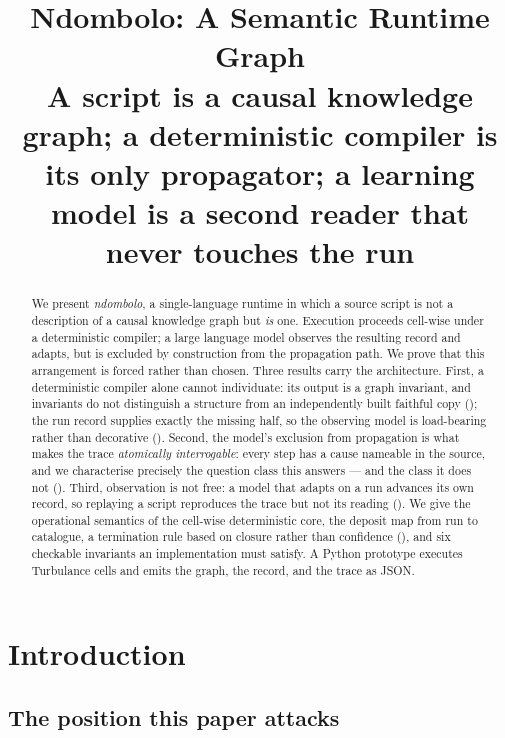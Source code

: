 \documentclass[twocolumn,11pt,a4paper]{article}
\title{\bfseries Ndombolo: A Semantic Runtime Graph\\[0.35em]
\large A script is a causal knowledge graph; a deterministic compiler is its
only propagator; a learning model is a second reader that never touches the run}
\author{}
\date{}
\theoremstyle{sup}
\theoremstyle{definition}
\theoremstyle{remark}
\begin{document}
\maketitle

\begin{abstract}
We present \emph{ndombolo}, a single-language runtime in which a source script
is not a description of a causal knowledge graph but \emph{is} one. Execution
proceeds cell-wise under a deterministic compiler; a large language model
observes the resulting record and adapts, but is excluded by construction from
the propagation path. We prove that this arrangement is forced rather than
chosen. Three results carry the architecture. First, a deterministic compiler
alone cannot individuate: its output is a graph invariant, and invariants do
not distinguish a structure from an independently built faithful copy
(); the run record supplies exactly the missing half,
so the observing model is load-bearing rather than decorative
(). Second, the model's exclusion from propagation
is what makes the trace \emph{atomically interrogable}: every step has a cause
nameable in the source, and we characterise precisely the question class this
answers --- and the class it does not ().
Third, observation is not free: a model that adapts on a run advances its own
record, so replaying a script reproduces the trace but not its reading
(). We give the operational semantics of the
cell-wise deterministic core, the deposit map from run to catalogue, a
termination rule based on closure rather than confidence
(), and six checkable
invariants an implementation must satisfy. A Python prototype executes
Turbulance cells and emits the graph, the record, and the trace as JSON.
\end{abstract}

\section{Introduction}
\label{sec:intro}

\subsection{The position this paper attacks}
\end{document}
